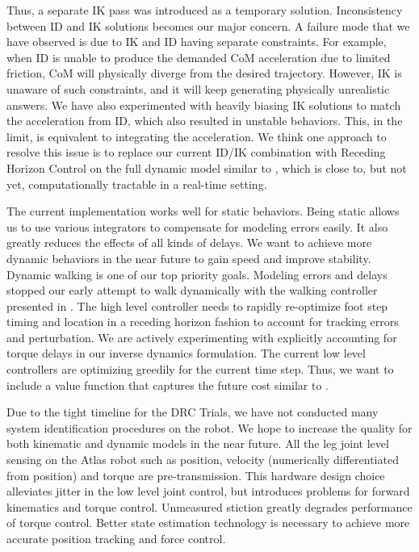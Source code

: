 \documentclass{ws-ijhr}
\begin{document}
Thus, a separate IK pass was introduced as a temporary solution. 
Inconsistency between ID and IK solutions becomes our major concern. 
A failure mode that we have observed is due to IK and ID having separate constraints. For 
example, when ID is unable to produce the demanded CoM acceleration due to 
limited friction, CoM will physically diverge from the desired trajectory. 
However, IK is unaware of such constraints, and it will keep generating
physically unrealistic answers. We have also experimented with heavily 
biasing IK solutions to match the acceleration from ID, which also resulted in 
unstable behaviors. This, in the limit, is equivalent to integrating the 
acceleration. We think one approach to resolve this issue is to replace our 
current ID/IK combination with Receding Horizon Control on the full dynamic 
model similar to \cite{tass_mpc}, which is close to, but not yet, 
computationally tractable in a real-time setting.

The current implementation works well for static behaviors. Being static allows
us to use various integrators to compensate for modeling errors easily. It 
also greatly reduces the effects of all kinds of delays. We want to achieve more
dynamic behaviors in the near future to gain speed and improve stability. Dynamic 
walking is one of our top priority goals. Modeling errors and delays 
stopped our early attempt to walk dynamically with the walking controller 
presented in \cite{sfeng_online}. The high level controller needs to rapidly 
re-optimize foot step timing and location in a receding horizon fashion to 
account for tracking errors and perturbation. We are actively experimenting with 
explicitly accounting for torque delays in our inverse dynamics formulation. 
The current low level controllers are optimizing greedily for the current 
time step. Thus, we want to include a value function that captures the future cost
similar to \cite{scott_qp}. 

Due to the tight timeline for the DRC Trials, we have not conducted many system 
identification procedures on the robot. We hope to increase the quality for 
both kinematic and dynamic models in the near future. All 
the leg joint level sensing on the Atlas robot such as position, velocity 
(numerically differentiated from position) and torque are pre-transmission. 
This hardware design choice alleviates jitter in the low level joint control, 
but introduces problems for forward kinematics and torque control. Unmeasured
stiction greatly degrades performance of torque control. Better state 
estimation technology is necessary to achieve more accurate position tracking 
and force control. 
\end{document}
